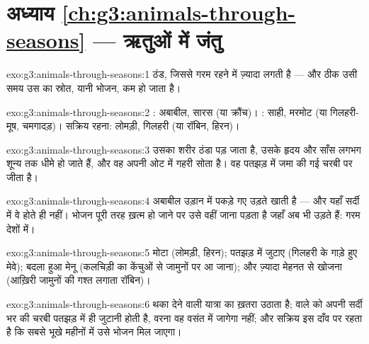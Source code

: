 \section*{अध्याय \ref{ch:g3:animals-through-seasons} --- ऋतुओं में जंतु}

\begin{solution}{exo:g3:animals-through-seasons:1}
ठंड, जिससे गरम रहने में ज़्यादा  लगती है --- और ठीक उसी समय उस
 का स्रोत, यानी भोजन, कम हो जाता है।
\end{solution}

\begin{solution}{exo:g3:animals-through-seasons:2}
: अबाबील, सारस (या क्रौंच)। : साही, मरमोट (या
गिलहरी-मूष, चमगादड़)। सक्रिय रहना: लोमड़ी, गिलहरी (या रॉबिन, हिरन)।
\end{solution}

\begin{solution}{exo:g3:animals-through-seasons:3}
उसका शरीर ठंडा पड़ जाता है, उसके हृदय और साँस लगभग शून्य तक धीमे हो
जाते हैं, और वह अपनी ओट में गहरी  सोता है। वह पतझड़ में जमा की गई
चरबी पर जीता है।
\end{solution}

\begin{solution}{exo:g3:animals-through-seasons:4}
अबाबील उड़ान में पकड़े गए उड़ते  खाती है --- और यहाँ सर्दी में वे
होते ही नहीं। भोजन पूरी तरह ख़त्म हो जाने पर उसे वहीं जाना पड़ता है
जहाँ  अब भी उड़ते हैं: गरम देशों में।
\end{solution}

\begin{solution}{exo:g3:animals-through-seasons:5}
मोटा  (लोमड़ी, हिरन); पतझड़ में जुटाए  (गिलहरी
के गाड़े हुए मेवे); बदला हुआ मेनू (कलचिड़ी का केंचुओं से जामुनों पर आ
जाना); और ज़्यादा मेहनत से खोजना (आख़िरी जामुनों की गश्त लगाता
रॉबिन)।
\end{solution}

\begin{solution}{exo:g3:animals-through-seasons:6}
 थका देने वाली यात्रा का ख़तरा उठाता है;  वाले को
अपनी सर्दी भर की चरबी पतझड़ में ही जुटानी होती है, वरना वह वसंत में
जागेगा नहीं; और सक्रिय  इस दाँव पर रहता है कि सबसे भूखे महीनों में
उसे भोजन मिल जाएगा।
\end{solution}

